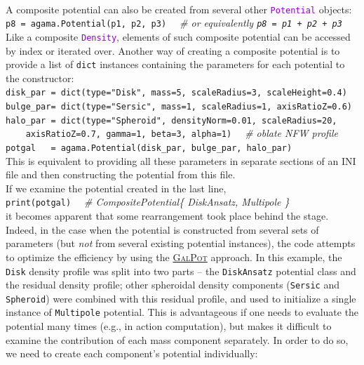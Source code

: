 \documentclass[12pt]{article}
\newcommand{\ttt}[1]{\textcolor{darkviolet}{\texttt{#1}}}
\newcommand{\ppp}[1]{\textcolor{darkolive} {\texttt{#1}}}
\begin{document}
\\[2mm]
A composite potential can also be created from several other \ttt{Potential} objects:\\
\texttt{p8 = agama.Potential(p1, p2, p3)} \textit{\color{Sepia} \ \ \# or equivalently \texttt{p8 = p1 + p2 + p3}}\\[2mm]
Like a composite \ttt{Density}, elements of such composite potential can be accessed by index or iterated over.
Another way of creating a composite potential is to provide a list of \texttt{dict} instances containing the parameters for each potential to the constructor:\\
\texttt{disk_par = dict(type="Disk", mass=5, scaleRadius=3, scaleHeight=0.4)}\\
\texttt{bulge_par= dict(type="Sersic", mass=1, scaleRadius=1, axisRatioZ=0.6)}\\
\texttt{halo_par = dict(type="Spheroid", densityNorm=0.01, scaleRadius=20,\\
\mbox{}~~~~axisRatioZ=0.7, gamma=1, beta=3, alpha=1)} \textit{\color{Sepia}\ \ \# oblate NFW profile}\\
\texttt{potgal~~~= agama.Potential(disk_par, bulge_par, halo_par)}\\
This is equivalent to providing all these parameters in separate sections of an INI file and then constructing the potential from this file.\\[2mm]
If we examine the potential created in the last line,\\
\texttt{print(potgal)}  \textit{\color{Sepia} \ \ \# CompositePotential\{ DiskAnsatz, Multipole \}}\\
it becomes apparent that some rearrangement took place behind the stage. Indeed, in the case when the potential is constructed from several sets of parameters (but \textit{not} from several existing potential instances), the code attempts to optimize the efficiency by using the \hyperref[sec:PotentialGalpot]{\textsc{GalPot}} approach. In this example, the \ppp{Disk} density profile was split into two parts -- the \ppp{DiskAnsatz} potential class and the residual density profile; other spheroidal density components (\ppp{Sersic} and \ppp{Spheroid}) were combined with this residual profile, and used to initialize a single instance of \ppp{Multipole} potential. This is advantageous if one needs to evaluate the potential many times (e.g., in action computation), but makes it difficult to examine the contribution of each mass component separately. In order to do so, we need to create each component's potential individually:\\
\end{document}
